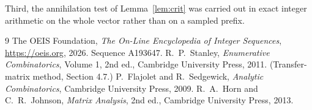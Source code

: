 \documentclass[11pt,a4paper]{article}
\theoremstyle{plain}
\theoremstyle{definition}
\begin{document}
Third, the annihilation test of Lemma~\ref{lem:crit} was carried out in exact integer
arithmetic on the whole vector rather than on a sampled prefix.

\begin{thebibliography}{9}
 The OEIS Foundation, \emph{The On-Line Encyclopedia of Integer
Sequences}, \url{https://oeis.org}, 2026. Sequence A193647.
 R.~P.~Stanley, \emph{Enumerative Combinatorics}, Volume 1, 2nd ed.,
Cambridge University Press, 2011. (Transfer-matrix method, Section 4.7.)
 P.~Flajolet and R.~Sedgewick, \emph{Analytic Combinatorics}, Cambridge
University Press, 2009.
 R.~A.~Horn and C.~R.~Johnson, \emph{Matrix Analysis}, 2nd ed., Cambridge
University Press, 2013.
\end{thebibliography}
\end{document}

